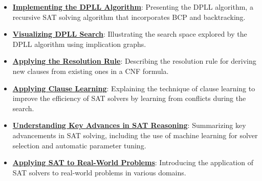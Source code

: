 \documentclass{article}%
\begin{document}
\begin{itemize}[leftmargin=*]
\item \href{https://purdue.brightspace.com/d2l/common/assets/pdfjs-d2l-dist/1.0.14-legacy/web/viewer.html?file=%2Fcontent%2Fenforced%2F1095467-wl.202510.CS.24300.001%2F15L2-SAT.pdf%3Fou%3D1095467&lang=en-us&container=d2l-fileviewer-rendered-pdf&fullscreen=d2l-fileviewer-rendered-pdf-dialog&height=667#page=21}{\textbf{Implementing the DPLL Algorithm}}: Presenting the DPLL algorithm, a recursive SAT solving algorithm that incorporates BCP and backtracking.%
\item \href{https://purdue.brightspace.com/d2l/common/assets/pdfjs-d2l-dist/1.0.14-legacy/web/viewer.html?file=%2Fcontent%2Fenforced%2F1095467-wl.202510.CS.24300.001%2F15L2-SAT.pdf%3Fou%3D1095467&lang=en-us&container=d2l-fileviewer-rendered-pdf&fullscreen=d2l-fileviewer-rendered-pdf-dialog&height=667#page=22}{\textbf{Visualizing DPLL Search}}: Illustrating the search space explored by the DPLL algorithm using implication graphs.%
\item \href{https://purdue.brightspace.com/d2l/common/assets/pdfjs-d2l-dist/1.0.14-legacy/web/viewer.html?file=%2Fcontent%2Fenforced%2F1095467-wl.202510.CS.24300.001%2F15L2-SAT.pdf%3Fou%3D1095467&lang=en-us&container=d2l-fileviewer-rendered-pdf&fullscreen=d2l-fileviewer-rendered-pdf-dialog&height=667#page=32}{\textbf{Applying the Resolution Rule}}: Describing the resolution rule for deriving new clauses from existing ones in a CNF formula.%
\item \href{https://purdue.brightspace.com/d2l/common/assets/pdfjs-d2l-dist/1.0.14-legacy/web/viewer.html?file=%2Fcontent%2Fenforced%2F1095467-wl.202510.CS.24300.001%2F15L2-SAT.pdf%3Fou%3D1095467&lang=en-us&container=d2l-fileviewer-rendered-pdf&fullscreen=d2l-fileviewer-rendered-pdf-dialog&height=667#page=34}{\textbf{Applying Clause Learning}}: Explaining the technique of clause learning to improve the efficiency of SAT solvers by learning from conflicts during the search.%
\item \href{https://purdue.brightspace.com/d2l/common/assets/pdfjs-d2l-dist/1.0.14-legacy/web/viewer.html?file=%2Fcontent%2Fenforced%2F1095467-wl.202510.CS.24300.001%2F15L2-SAT.pdf%3Fou%3D1095467&lang=en-us&container=d2l-fileviewer-rendered-pdf&fullscreen=d2l-fileviewer-rendered-pdf-dialog&height=667#page=35}{\textbf{Understanding Key Advances in SAT Reasoning}}: Summarizing key advancements in SAT solving, including the use of machine learning for solver selection and automatic parameter tuning.%
\item \href{https://purdue.brightspace.com/d2l/common/assets/pdfjs-d2l-dist/1.0.14-legacy/web/viewer.html?file=%2Fcontent%2Fenforced%2F1095467-wl.202510.CS.24300.001%2F15L2-SAT.pdf%3Fou%3D1095467&lang=en-us&container=d2l-fileviewer-rendered-pdf&fullscreen=d2l-fileviewer-rendered-pdf-dialog&height=667#page=37}{\textbf{Applying SAT to Real-World Problems}}: Introducing the application of SAT solvers to real-world problems in various domains.%

\end{itemize}
\end{document}
